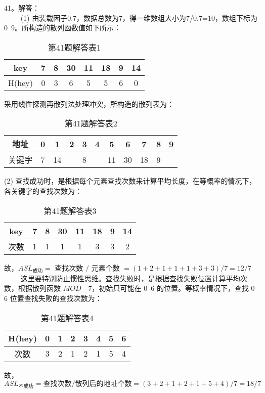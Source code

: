 41。解答：\\
$\qquad$ (1) 由装载因子0.7，数据总数为7，得一维数组大小为7/0.7=10，数组下标为0~9。所构造的散列函数值如下所示：
\begin{table}[ht]
\centering
\caption{第41题解答表1}\label{tab_CSN10_2}
\begin{tabular}{|c|c|c|c|c|c|c|c|}
\hline
key & 7 & 8 & 30 & 11 & 18 & 9 & 14 \\
\hline
H(hey) & 0 & 3 & 6 & 5 & 5 & 6 & 0 \\
\hline
\end{tabular}
\end{table}
采用线性探测再散列法处理冲突，所构造的散列表为： 
\begin{table}[ht]
\centering
\caption{第41题解答表2}\label{tab_CSN10_3}
\begin{tabular}{|c|c|c|c|c|c|c|c|c|c|c|}
\hline
地址 & 0 & 1 & 2 & 3 & 4 & 5 & 6 & 7 & 8 & 9 \\
\hline
关键字 & 7 & 14 &  & 8 &  & 11 & 30 & 18 & 9 &  \\
\hline
\end{tabular}
\end{table}
(2) 查找成功时，是根据每个元素查找次数来计算平均长度，在等概率的情况下，各关键字的查找次数为：\\
\begin{table}[ht]
\centering
\caption{第41题解答表3}\label{tab_CSN10_4}
\begin{tabular}{|c|c|c|c|c|c|c|c|}
\hline
key & 7 & 8 & 30 & 11 & 18 & 9 & 14 \\
\hline
次数 & 1 & 1 & 1 & 1 & 3 & 3 & 2 \\
\hline
\end{tabular}
\end{table}
故，$ASL_{\text{成功}}=$ 查找次数 $/$ 元素个数 $=(1+2+1+1+1+3+3)/7=12/7$  \\
$\qquad$ 这里要特别防止惯性思维。查找失败时，是根据查找失败位置计算平均次数，根据散列函数 $MOD  \quad 7$，初始只可能在 $0$~$6$ 的位置。等概率情况下，查找 $0$~$6$ 位置查找失败的查找次数为：\\
\begin{table}[ht]
\centering
\caption{第41题解答表4}\label{tab_CSN10_5}
\begin{tabular}{|c|c|c|c|c|c|c|c|}
\hline
H(hey) & 0 & 1 & 2 & 3 & 4 & 5 & 6 \\
\hline
次数 & 3 & 2 & 1 & 2 & 1 & 5 & 4 \\
\hline
\end{tabular}
\end{table}
故，$ASL_{\text{不成功}}=\text{查找次数}/\text{散列后的地址个数}=(3+2+1+2+1+5+4)/7=18/7$

